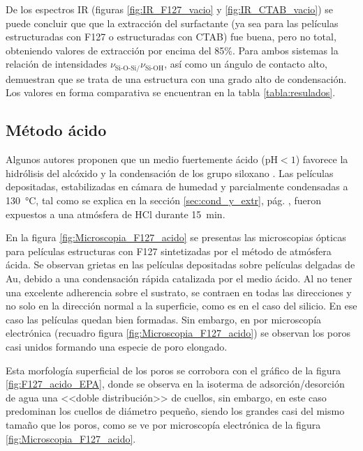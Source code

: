 		 De los espectros IR  (figuras \ref{fig:IR_F127_vacio} y \ref{fig:IR_CTAB_vacio}) se puede concluir que que la extracción del surfactante (ya sea para las películas estructuradas con F127 o estructuradas con CTAB) fue buena, pero no total, obteniendo valores de extracción por encima del 85\%. Para ambos sistemas la relación de intensidades $\nu_{\text{Si-O-Si/}}\nu_{\text{Si-OH}}$, así como un ángulo de contacto alto, demuestran que se trata de una estructura con una grado alto de condensación. Los valores en forma comparativa se encuentran en la tabla \ref{tabla:resulados}.


	 \subsection{Método ácido}

	 	 Algunos autores proponen que un medio fuertemente ácido (pH$<1$) favorece la hidrólisis del alcóxido y la condensación de los grupo siloxano \cite{Soler-Illia2011,Doshi2000a,Boissiere2000,Huo1996,Beck1992}. Las películas depositadas, estabilizadas en cámara de humedad y  parcialmente condensadas a \SI{130}{\celsius}, tal como se explica en la sección \ref{sec:cond_y_extr}, pág. \pageref{sec:cond_y_extr}, fueron expuestos a una atmósfera de HCl durante \SI{15}{\minute}. 

		 En la figura \ref{fig:Microscopia_F127_acido} se presentas las microscopias ópticas para películas estructuras con F127 sintetizadas por el método de atmósfera ácida. Se observan grietas en las películas depositadas sobre películas delgadas de Au, debido a una condensación rápida catalizada por el medio ácido. Al no tener una excelente adherencia sobre el sustrato, se contraen en todas las direcciones y no solo en la dirección normal a la superficie, como es en el caso del silicio\cite{Sakatani2006,Boissiere2005,Guillemin2010}. En ese caso las películas quedan bien formadas. Sin embargo, en por microscopía electrónica (recuadro figura \ref{fig:Microscopia_F127_acido}) se observan los poros casi unidos formando una especie de poro elongado.
	
		 Esta morfología superficial de los poros se corrobora con el gráfico de la figura \ref{fig:F127_acido_EPA}, donde se observa en la isoterma de adsorción/desorción de agua una <<doble distribución>> de cuellos, sin embargo, en este caso predominan los cuellos de diámetro pequeño, siendo los grandes casi del mismo tamaño que los poros, como se ve por microscopía electrónica de la figura \ref{fig:Microscopia_F127_acido}.
	

